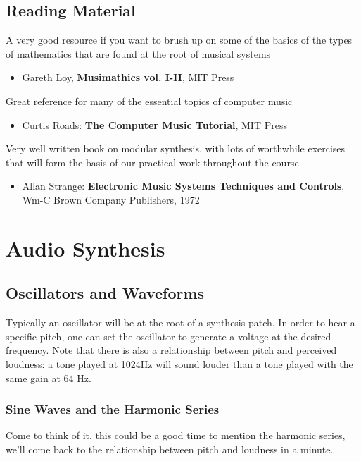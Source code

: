 \documentclass[11pt]{article}
\begin{document}
\subsection{Reading Material}
\label{sec:org1819e21}

A very good resource if you want to brush up on some of the basics of the types of mathematics that are found at the root of musical systems
\begin{itemize}
\item Gareth Loy, \textbf{Musimathics vol. I-II}, MIT Press
\end{itemize}

Great reference for many of the essential topics of computer music
\begin{itemize}
\item Curtis Roads: \textbf{The Computer Music Tutorial}, MIT Press
\end{itemize}

Very well written book on modular synthesis, with lots of worthwhile exercises that will form the basis of our practical work throughout the course
\begin{itemize}
\item Allan Strange: \textbf{Electronic Music Systems Techniques and Controls}, Wm-C Brown Company Publishers, 1972
\end{itemize}

\section{Audio Synthesis}
\label{sec:orgc32488a}
\subsection{Oscillators and Waveforms}
\label{sec:org69e1f96}
Typically an oscillator will be at the root of a synthesis patch. 
In order to hear a specific pitch, one can set the oscillator to 
generate a voltage at the desired frequency.  
Note that there is also a relationship between pitch and perceived 
loudness: a tone played at 1024Hz will sound louder than a tone played with the same gain at 64 Hz.

\subsubsection{Sine Waves and the Harmonic Series}
\label{sec:org77379f4}
Come to think of it, this could be a good time to mention the harmonic
series, we'll come back to the relationship between pitch and loudness
in a minute. 
\end{document}
